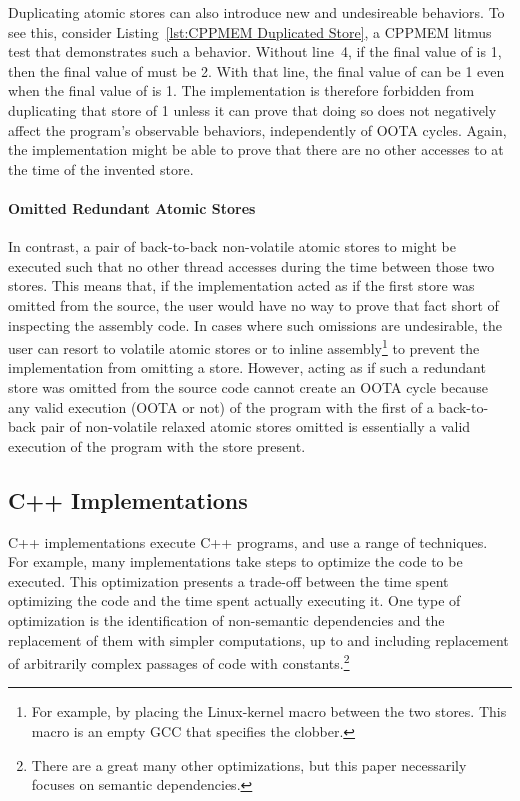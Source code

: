 \documentclass[10]{article}
\begin{document}
Duplicating atomic stores can also introduce new and undesireable
behaviors.
To see this, consider Listing~\ref{lst:CPPMEM Duplicated Store}, a CPPMEM
litmus test that demonstrates such a behavior.
Without line~4, if the final value of  is 1, then the final value
of  must be 2.
With that line, the final value of  can be 1 even when the
final value of  is 1.
The implementation is therefore forbidden from duplicating that store of 1
unless it can prove that doing so does not negatively affect the
program's observable behaviors, independently of OOTA cycles.
Again, the implementation might be able to prove that there
are no other accesses to  at the time of the invented store.

\paragraph{Omitted Redundant Atomic Stores}
In contrast, a pair of back-to-back non-volatile atomic stores to 
might be executed such that no other thread accesses 
during the time between those two stores.
This means that, if the implementation acted as if the first store was omitted
from the source, the user would have no way to prove that fact short of
inspecting the assembly code.
In cases where such omissions are undesirable, the user can resort to
volatile atomic stores or to inline assembly\footnote{
	For example, by placing the Linux-kernel  macro
	between the two stores.
	This macro is an empty GCC  that specifies the 
	clobber.}
to prevent the implementation from omitting a store.
However, acting as if such a redundant store was omitted from the source
code cannot create an OOTA cycle because any valid execution (OOTA or not)
of the program with the first of a back-to-back pair of non-volatile
relaxed atomic stores omitted is essentially a valid execution of the
program with the store present.

\subsection{C++ Implementations}
\label{sec:C++ Implementations}

C++ implementations execute C++ programs, and use a range of techniques.
For example, many implementations take steps to optimize the code to
be executed.
This optimization presents a trade-off between the time spent optimizing
the code and the time spent actually executing it.
One type of optimization is the identification of non-semantic dependencies
and the replacement of them with simpler computations, up to and including
replacement of arbitrarily complex passages of code with constants.\footnote{
	There are a great many other optimizations, but this paper
	necessarily focuses on semantic dependencies.}
\end{document}
